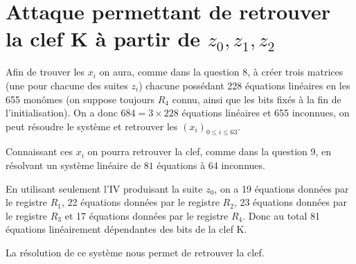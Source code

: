 \section{Attaque permettant de retrouver la clef K à partir de $z_0, z_1, z_2$}
Afin de trouver les $x_i$ on aura, comme dans la question 8, à créer trois matrices (une pour chacune des suites $z_i$)
chacune possédant 228 équations linéaires en les 655 monômes (on suppose toujours $R_4$ connu, ainsi que les bits fixés à la fin de l'initialisation).
On a donc $684 = 3 \times 228$ équations linéaires et 655 inconnues, on peut résoudre le système et retrouver les $(x_i)_{0\leq i \leq 63}$.

Connaissant ces $x_i$ on pourra retrouver la clef, comme dans la question 9, en résolvant un système linéaire de $81$ équations à 64 inconnues.

En utilisant seulement l'IV produisant la suite $z_0$, on a 19 équations données par le registre $R_1$,
22 équations données par le registre $R_2$, 23 équations données par le registre $R_3$ et 17 équations données par le registre $R_4$.
Donc au total 81 équations linéairement dépendantes des bits de la clef K.

La résolution de ce système nous permet de retrouver la clef.
